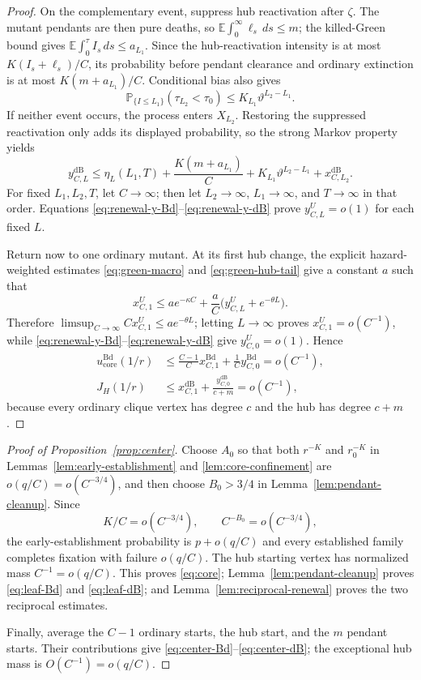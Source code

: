 \documentclass[11pt]{article}
\theoremstyle{definition}
\theoremstyle{remark}
\newcommand{\Bd}{\mathrm{Bd}}
\newcommand{\dB}{\mathrm{dB}}
\newcommand{\Prob}{\mathbb P}
\begin{document}
\begin{proof}
On the complementary event, suppress hub reactivation after $\zeta$.
The mutant pendants are then pure deaths, so
$\mathbb E\int_0^\infty\ell_s\,ds\leq m$; the killed-Green bound gives
$\mathbb E\int_0^\tau I_s\,ds\leq a_{L_1}$.  Since the hub-reactivation
intensity is at most $K(I_s+\ell_s)/C$, its probability before pendant
clearance and ordinary extinction is at most
$K(m+a_{L_1})/C$.  Conditional bias also gives
\[
 \Prob_{\{I\leq L_1\}}(\tau_{L_2}<\tau_0)
 \leq K_{L_1}\vartheta^{L_2-L_1}.
\]
If neither event occurs, the process enters $X_{L_2}$.  Restoring the
suppressed reactivation only adds its displayed probability, so the strong
Markov property yields
\begin{equation}
 y^{\dB}_{C,L}
 \leq \eta_L(L_1,T)+\frac{K(m+a_{L_1})}{C}
      +K_{L_1}\vartheta^{L_2-L_1}+x^{\dB}_{C,L_2}.
\label{eq:renewal-y-dB}
\end{equation}
For fixed $L_1,L_2,T$, let $C\to\infty$; then let $L_2\to\infty$,
$L_1\to\infty$, and $T\to\infty$ in that order.  Equations
\eqref{eq:renewal-y-Bd}--\eqref{eq:renewal-y-dB} prove
$y^U_{C,L}=o(1)$ for each fixed $L$.

Return now to one ordinary mutant.  At its first hub change, the explicit
hazard-weighted estimates \eqref{eq:green-macro} and
\eqref{eq:green-hub-tail} give a constant $a$ such that
\begin{equation}
 x^U_{C,1}\leq a e^{-\kappa C}
 +\frac aC\bigl(y^U_{C,L}+e^{-\theta L}\bigr).
\label{eq:renewal-refined}
\end{equation}
Therefore
$\limsup_{C\to\infty}Cx^U_{C,1}\leq ae^{-\theta L}$; letting $L\to\infty$
proves $x^U_{C,1}=o(C^{-1})$, while
\eqref{eq:renewal-y-Bd}--\eqref{eq:renewal-y-dB} give
$y^U_{C,0}=o(1)$.  Hence
\begin{align*}
 u_{\mathrm{core}}^{\Bd}(1/r)
 &\leq\frac{C-1}{C}x^{\Bd}_{C,1}+\frac1Cy^{\Bd}_{C,0}
 =o(C^{-1}),\\
 J_H(1/r)
 &\leq x^{\dB}_{C,1}+\frac{y^{\dB}_{C,0}}{c+m}
 =o(C^{-1}),
\end{align*}
because every ordinary clique vertex has degree $c$ and the hub has degree
$c+m$.
\end{proof}

\begin{proof}[Proof of Proposition~\ref{prop:center}]
Choose $A_0$ so that both $r^{-K}$ and $r_0^{-K}$ in
Lemmas~\ref{lem:early-establishment} and \ref{lem:core-confinement} are
$o(q/C)=o(C^{-3/4})$, and then choose $B_0>3/4$ in
Lemma~\ref{lem:pendant-cleanup}.  Since
\[
 K/C=o(C^{-3/4}),\qquad C^{-B_0}=o(C^{-3/4}),
\]
the early-establishment probability is $p+o(q/C)$ and every established
family completes fixation with failure $o(q/C)$.  The hub starting vertex
has normalized mass $C^{-1}=o(q/C)$.  This proves \eqref{eq:core};
Lemma~\ref{lem:pendant-cleanup} proves \eqref{eq:leaf-Bd} and
\eqref{eq:leaf-dB}; and Lemma~\ref{lem:reciprocal-renewal} proves the two
reciprocal estimates.

Finally, average the $C-1$ ordinary starts, the hub start, and the $m$
pendant starts.  Their contributions give
\eqref{eq:center-Bd}--\eqref{eq:center-dB}; the exceptional hub mass is
$O(C^{-1})=o(q/C)$.
\end{proof}
\end{document}
